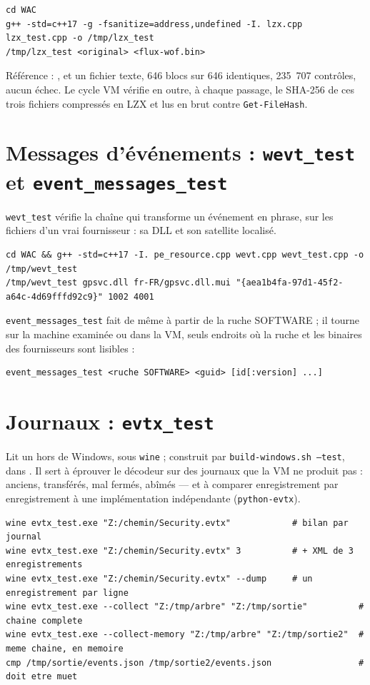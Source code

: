 \documentclass[11pt,a4paper,oneside]{report}
\begin{document}
\begin{lstlisting}
cd WAC
g++ -std=c++17 -g -fsanitize=address,undefined -I. lzx.cpp lzx_test.cpp -o /tmp/lzx_test
/tmp/lzx_test <original> <flux-wof.bin>
\end{lstlisting}

Référence : ,  et un fichier texte,
646 blocs sur 646 identiques, 235~707 contrôles, aucun échec. Le cycle VM
vérifie en outre, à chaque passage, le SHA-256 de ces trois fichiers compressés
en LZX et lus en brut contre \texttt{Get-FileHash}.

\section{Messages d'événements : \texttt{wevt\_test} et \texttt{event\_messages\_test}}

\texttt{wevt\_test} vérifie la chaîne qui transforme un événement en phrase,
sur les fichiers d'un vrai fournisseur : sa DLL et son satellite localisé.

\begin{lstlisting}
cd WAC && g++ -std=c++17 -I. pe_resource.cpp wevt.cpp wevt_test.cpp -o /tmp/wevt_test
/tmp/wevt_test gpsvc.dll fr-FR/gpsvc.dll.mui "{aea1b4fa-97d1-45f2-a64c-4d69fffd92c9}" 1002 4001
\end{lstlisting}

\texttt{event\_messages\_test} fait de même à partir de la ruche SOFTWARE ; il
tourne sur la machine examinée ou dans la VM, seuls endroits où la ruche et les
binaires des fournisseurs sont lisibles :

\begin{lstlisting}
event_messages_test <ruche SOFTWARE> <guid> [id[:version] ...]
\end{lstlisting}

\section{Journaux : \texttt{evtx\_test}}

Lit un  hors de Windows, sous \texttt{wine} ; construit par
\texttt{build-windows.sh --test}, dans . Il sert à éprouver
le décodeur sur des journaux que la VM ne produit pas : anciens, transférés,
mal fermés, abîmés — et à comparer enregistrement par enregistrement à une
implémentation indépendante (\texttt{python-evtx}).

\begin{lstlisting}
wine evtx_test.exe "Z:/chemin/Security.evtx"            # bilan par journal
wine evtx_test.exe "Z:/chemin/Security.evtx" 3          # + XML de 3 enregistrements
wine evtx_test.exe "Z:/chemin/Security.evtx" --dump     # un enregistrement par ligne
wine evtx_test.exe --collect "Z:/tmp/arbre" "Z:/tmp/sortie"          # chaine complete
wine evtx_test.exe --collect-memory "Z:/tmp/arbre" "Z:/tmp/sortie2"  # meme chaine, en memoire
cmp /tmp/sortie/events.json /tmp/sortie2/events.json                 # doit etre muet
\end{lstlisting}
\end{document}
